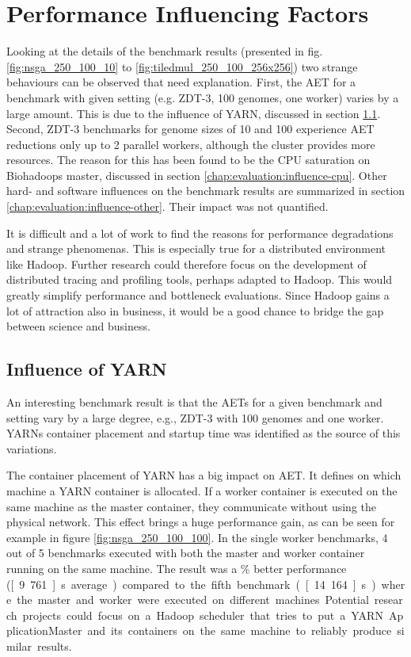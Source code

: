 \section{Performance Influencing Factors}
\label{chap:evaluation:influence}
Looking at the details of the benchmark results (presented in fig. \ref{fig:nsga_250_100_10} to \ref{fig:tiledmul_250_100_256x256}) two strange behaviours can be observed that need explanation. First, the AET for a benchmark with given setting (e.g. ZDT-3, 100 genomes, one worker) varies by a large amount. This is due to the influence of YARN, discussed in section \ref{chap:evaluation:influence-yarn}. Second, ZDT-3 benchmarks for genome sizes of 10 and 100 experience AET reductions only up to 2 parallel workers, although the cluster provides more resources. The reason for this has been found to be the CPU saturation on Biohadoops master, discussed in section \ref{chap:evaluation:influence-cpu}. Other hard- and software influences on the benchmark results are summarized in section \ref{chap:evaluation:influence-other}. Their impact was not quantified.

It is difficult and a lot of work to find the reasons for performance degradations and strange phenomenas. This is especially true for a distributed environment like Hadoop. Further research could therefore focus on the development of distributed tracing and profiling tools, perhaps adapted to Hadoop. This would greatly simplify performance and bottleneck evaluations. Since Hadoop gains a lot of attraction also in business, it would be a good chance to bridge the gap between science and business.

\subsection{Influence of YARN}
\label{chap:evaluation:influence-yarn}
An interesting benchmark result is that the AETs for a given benchmark and setting vary by a large degree, e.g., ZDT-3 with 100 genomes and one worker. YARNs container placement and startup time was identified as the source of this variations.

The container placement of YARN has a big impact on AET. It defines on which machine a YARN container is allocated. If a worker container is executed on the same machine as the master container, they communicate without using the physical network. This effect brings a huge performance gain, as can be seen for example in figure \ref{fig:nsga_250_100_100}. In the single worker benchmarks, 4 out of 5 benchmarks executed with both the master and worker container running on the same machine. The result was a \unit[50]{\%} better performance (\unit[9.761]{s} average) compared to the fifth benchmark (\unit[14.164]{s}) where the master and worker were executed on different machines. Potential research projects could focus on a Hadoop scheduler that tries to put a YARN ApplicationMaster and its containers on the same machine to reliably produce similar results.

